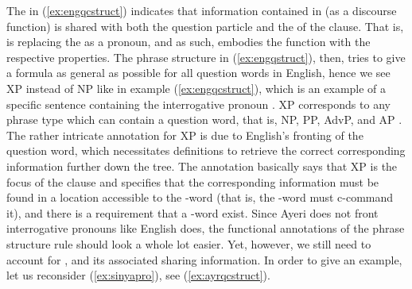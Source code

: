 The \Avm{} in (\ref{ex:engqcstruct}) indicates that information contained in
\Foc{} (as a discourse function) is shared with both the question particle \Q{}
and the \Obj{} of the clause. That is, \Q{} is replacing the \Obj{} as a
pronoun, and as such, embodies the \Foc{} function with the respective
properties. The phrase structure in (\ref{ex:engqstruct}), then, tries to give
a formula as general as possible for all question words in English, hence we
see XP instead of NP like in example (\ref{ex:engqcstruct}), which is an
example of a specific sentence containing the interrogative pronoun .
XP corresponds to any phrase type which can contain a question word, that is,
NP, PP, AdvP, and AP \citep[407] {dalrymple2001}. The rather intricate
annotation for XP is due to English's fronting of the question word, which
necessitates definitions to retrieve the correct corresponding information
further down the tree. The annotation basically says that XP is the focus of
the clause and specifies that the corresponding information must be found in a
location accessible to the -word (that is, the -word must
c-command it), and there is a requirement that a -word exist. Since
Ayeri does not front interrogative pronouns like English does, the functional
annotations of the phrase structure rule should look a whole lot easier. Yet,
however, we still need to account for \Q{}, \Foc{} and its associated \GF{}
sharing information. In order to give an example, let us reconsider
(\ref{ex:sinyapro}), see (\ref{ex:ayrqcstruct}).

